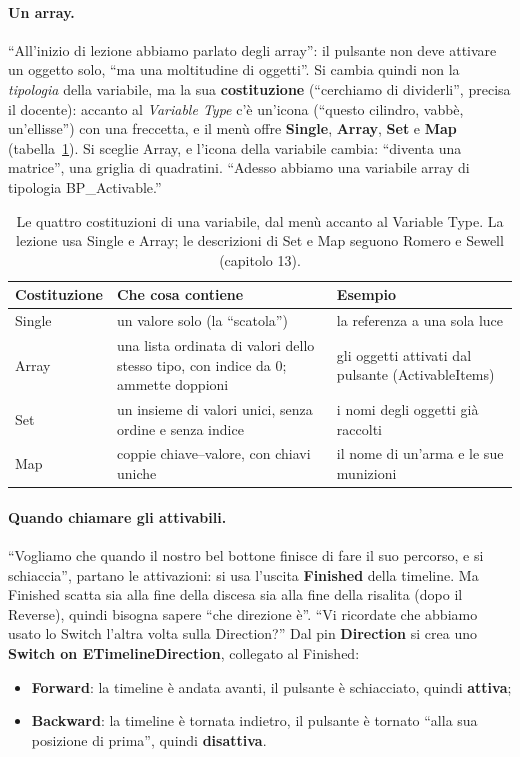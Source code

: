 \paragraph{Un array.} ``All'inizio di lezione abbiamo parlato degli array'': il pulsante
non deve attivare un oggetto solo, ``ma una moltitudine di oggetti''. Si cambia quindi
non la \emph{tipologia} della variabile, ma la sua \textbf{costituzione} (``cerchiamo di
dividerli'', precisa il docente): accanto al \emph{Variable Type} c'è un'icona (``questo
cilindro, vabbè, un'ellisse'') con una freccetta, e il menù offre \textbf{Single},
\textbf{Array}, \textbf{Set} e \textbf{Map} (tabella~\ref{ue7:tab:contenitori}). Si sceglie
Array, e l'icona della variabile cambia: ``diventa una matrice'', una griglia di
quadratini. ``Adesso abbiamo una variabile array di tipologia BP\_Activable.''

\begin{table}[htbp]
\centering
\small
\begin{tabular}{@{}p{2.4cm}p{5.8cm}p{5.8cm}@{}}
\toprule
\textbf{Costituzione} & \textbf{Che cosa contiene} & \textbf{Esempio} \\
\midrule
Single & un valore solo (la ``scatola'') & la referenza a una sola luce \\
Array & una lista ordinata di valori dello stesso tipo, con indice da 0; ammette
doppioni & gli oggetti attivati dal pulsante (ActivableItems) \\
Set & un insieme di valori unici, senza ordine e senza indice & i nomi degli oggetti
già raccolti \\
Map & coppie chiave--valore, con chiavi uniche & il nome di un'arma e le sue
munizioni \\
\bottomrule
\end{tabular}
\caption{Le quattro costituzioni di una variabile, dal menù accanto al Variable Type.
La lezione usa Single e Array; le descrizioni di Set e Map seguono Romero e Sewell
(capitolo 13).}
\label{ue7:tab:contenitori}
\end{table}

\paragraph{Quando chiamare gli attivabili.} ``Vogliamo che quando il nostro bel bottone
finisce di fare il suo percorso, e si schiaccia'', partano le attivazioni: si usa
l'uscita \textbf{Finished} della timeline. Ma Finished scatta sia alla fine della
discesa sia alla fine della risalita (dopo il Reverse), quindi bisogna sapere ``che
direzione è''. ``Vi ricordate che abbiamo usato lo Switch l'altra volta sulla
Direction?'' Dal pin \textbf{Direction} si crea uno \textbf{Switch on
ETimelineDirection}, collegato al Finished:
\begin{itemize}
  \item \textbf{Forward}: la timeline è andata avanti, il pulsante è schiacciato,
        quindi \textbf{attiva};
  \item \textbf{Backward}: la timeline è tornata indietro, il pulsante è tornato
        ``alla sua posizione di prima'', quindi \textbf{disattiva}.
\end{itemize}

